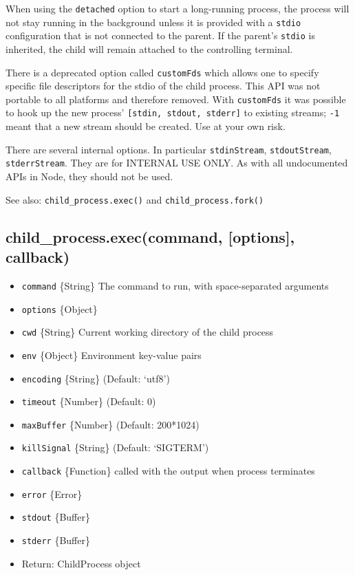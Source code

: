 When using the \texttt{detached} option to start a long-running process,
the process will not stay running in the background unless it is
provided with a \texttt{stdio} configuration that is not connected to
the parent. If the parent's \texttt{stdio} is inherited, the child will
remain attached to the controlling terminal.

There is a deprecated option called \texttt{customFds} which allows one
to specify specific file descriptors for the stdio of the child process.
This API was not portable to all platforms and therefore removed. With
\texttt{customFds} it was possible to hook up the new process'
\texttt{{[}stdin, stdout, stderr{]}} to existing streams; \texttt{-1}
meant that a new stream should be created. Use at your own risk.

There are several internal options. In particular \texttt{stdinStream},
\texttt{stdoutStream}, \texttt{stderrStream}. They are for INTERNAL USE
ONLY. As with all undocumented APIs in Node, they should not be used.

See also: \texttt{child\_process.exec()} and
\texttt{child\_process.fork()}

\subsection{child\_process.exec(command, {[}options{]}, callback)}

\begin{itemize}
\item
  \texttt{command} \{String\} The command to run, with space-separated
  arguments
\item
  \texttt{options} \{Object\}
\item
  \texttt{cwd} \{String\} Current working directory of the child process
\item
  \texttt{env} \{Object\} Environment key-value pairs
\item
  \texttt{encoding} \{String\} (Default: `utf8')
\item
  \texttt{timeout} \{Number\} (Default: 0)
\item
  \texttt{maxBuffer} \{Number\} (Default: 200*1024)
\item
  \texttt{killSignal} \{String\} (Default: `SIGTERM')
\item
  \texttt{callback} \{Function\} called with the output when process
  terminates
\item
  \texttt{error} \{Error\}
\item
  \texttt{stdout} \{Buffer\}
\item
  \texttt{stderr} \{Buffer\}
\item
  Return: ChildProcess object
\end{itemize}

